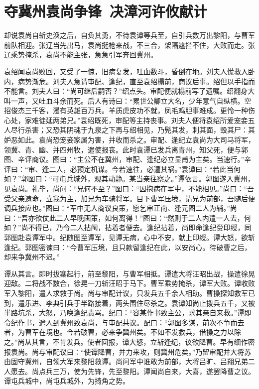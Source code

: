 \chapter{夺冀州袁尚争锋~决漳河许攸献计}

却说袁尚自斩史涣之后，自负其勇，不待袁谭等兵至，自引兵数万出黎阳，与曹军前队相迎。张辽当先出马，袁尚挺枪来战，不三合，架隔遮拦不住，大败而走。张辽乘势掩杀，袁尚不能主张，急急引军奔回冀州。

袁绍闻袁尚败回，又受了一惊，旧病复发，吐血数斗，昏倒在地。刘夫人慌救入卧内，病势渐危。刘夫人急请审配、逢纪，直至袁绍榻前，商议后事。绍但以手指而不能言。刘夫人曰：“尚可继后嗣否？”绍点头。审配便就榻前写了遗嘱。绍翻身大叫一声，又吐血斗余而死。后人有诗曰：“累世公卿立大名，少年意气自纵横。空招俊杰三千客，漫有英雄百万兵。羊质虎皮功不就，凤毛鸡胆事难成。更怜一种伤心处，家难徒延两弟兄。”袁绍既死，审配等主持丧事。刘夫人便将袁绍所爱宠妾五人尽行杀害；又恐其阴魂于九泉之下再与绍相见，乃髡其发，刺其面，毁其尸：其妒恶如此。袁尚恐宠妾家属为害，并收而杀之。审配、逢纪立袁尚为大司马将军，领冀、青、幽、并四州牧，遣使报丧。此时袁谭已发兵离青州，知父死，便与郭图、辛评商议。图曰：“主公不在冀州，审配、逢纪必立显甫为主矣。当速行。”辛评曰：“审、逢二人，必预定机谋。今若速往，必遭其祸。”袁谭曰：“若此当何如？”郭图曰：“可屯兵城外，观其动静。某当亲往察之。”谭依言。郭图遂入冀州，见袁尚。礼毕，尚问：“兄何不至？”图曰：“因抱病在军中，不能相见。”尚曰：“吾受父亲遗命，立我为主，加兄为车骑将军。目下曹军压境，请兄为前部，吾随后便调兵接应也。”图曰：“军中无人商议良策，愿乞审正南、逢元图二人为辅。”尚曰：“吾亦欲仗此二人早晚画策，如何离得！”图曰：“然则于二人内遣一人去，何如？”尚不得已，乃令二人拈阄，拈着者便去。逢纪拈着，尚即命逢纪赍印绶，同郭图赴袁谭军中。纪随图至谭军，见谭无病，心中不安，献上印绶。谭大怒，欲斩逢纪。郭图密谏曰：“今曹军压境，且只款留逢纪在此，以安尚心。待破曹之后，却来争冀州不迟。”

谭从其言。即时拔寨起行，前至黎阳，与曹军相抵。谭遣大将汪昭出战，操遣徐晃迎敌。二将战不数合，徐晃一刀斩汪昭于马下。曹军乘势掩杀，谭军大败。谭收败军入黎阳，遣人求救于尚。尚与审配计议，只发兵五千余人相助。曹操探知救军已到，遣乐进、李典引兵于半路接着，两头围住尽杀之。袁谭知尚止拨兵五千，又被半路坑杀，大怒，乃唤逢纪责骂。纪曰：“容某作书致主公，求其亲自来救。”谭即令纪作书，遣人到冀州致袁尚，与审配共议。配曰：“郭图多谋，前次不争而去者，为曹军在境也。今若破曹，必来争冀州矣。不如不发救兵，借操之力以除之。”尚从其言，不肯发兵。使者回报，谭大怒，立斩逢纪，议欲降曹。早有细作密报袁尚。尚与审配议曰：“使谭降曹，并力来攻，则冀州危矣。”乃留审配并大将苏由固守冀州，自领大军来黎阳救谭。尚问军中谁敢为前部，大将吕旷、吕翔兄弟二人愿去。尚点兵三万，使为先锋，先至黎阳。谭闻尚自来，大喜，遂罢降曹之议。谭屯兵城中，尚屯兵城外，为掎角之势。

